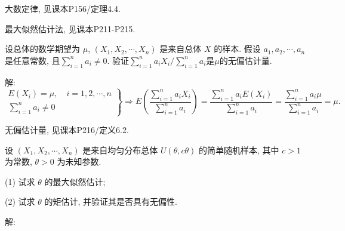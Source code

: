 \documentclass[standard]{ExBook}
\renewenvironment{shaded}{%
  \def\FrameCommand{\fboxsep=\FrameSep \colorbox{shadecolor}}%
  \MakeFramed{\advance\hsize-\width \FrameRestore}%
}{%
  \endMakeFramed
}
\begin{document}
\begin{qitems}
\textcolor{themeColor}{\selectfont {} 大数定律, 见课本P156/定理4.4.}

\textcolor{themeColor}{\selectfont {} 最大似然估计法, 见课本P211-P215.}

\vspace{2.5cm-5em}

    \begin{bbox}
    \begin{shaded}
        \qitem
设总体的数学期望为 \(\mu\), \((X_1, X_2, \cdots, X_n)\) 是来自总体 \(X\) 的样本. 假设 \(a_1, a_2, \cdots, a_n\) 是任意常数, 且\(\displaystyle\sum\limits_{i=1}^n a_i \neq 0\). 验证\(\displaystyle\sum\limits_{i=1}^n a_i X_i \Big/ \displaystyle\sum\limits_{i=1}^n a_i\)是\(\mu\)的无偏估计量.
    \end{shaded}
    \end{bbox}

\vspace{\dimexpr2.5cm-5em\relax}

解: 
$$
\left.
\begin{array}{r}
E(X_i)=\mu,\quad i=1,2,\cdots,n\\
\sum\limits_{i=1}^{n}a_i\neq0
\end{array}
\right\}
\Longrightarrow
E\left(\frac{\sum\limits_{i=1}^{n}a_iX_i}{\sum\limits_{i=1}^{n}a_i}\right)
=
\frac{\sum\limits_{i=1}^{n}a_iE(X_i)}{\sum\limits_{i=1}^{n}a_i}
=
\frac{\sum\limits_{i=1}^{n}a_i\mu}{\sum\limits_{i=1}^{n}a_i}
=\mu.
$$

\textcolor{themeColor}{\selectfont {} 无偏估计量, 见课本P216/定义6.2.}

\vspace{2.5cm-5em}

    \begin{bbox}
    \begin{shaded}
        \qitem
设 \((X_1, X_2, \cdots, X_n)\) 是来自均匀分布总体 \(U(\theta, c\theta)\) 的简单随机样本, 其中 \(c > 1\) 为常数, \(\theta > 0\) 为未知参数.

(1) 试求 \(\theta\) 的最大似然估计;

(2) 试求 \(\theta\) 的矩估计, 并验证其是否具有无偏性.
    \end{shaded}
    \end{bbox}

\vspace{\dimexpr2.5cm-5em\relax}

解: 


\end{qitems}
\end{document}
